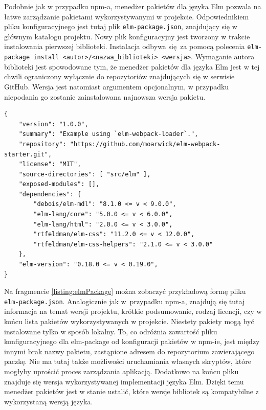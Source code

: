 Podobnie jak w przypadku npm-a, menedżer pakietów dla języka Elm pozwala na łatwe zarządzanie pakietami wykorzystywanymi w projekcie. Odpowiednikiem pliku konfiguracyjnego jest tutaj plik \lstinline{elm-package.json}, znajdujący się w głównym katalogu projektu. Nowy plik konfiguracyjny jest tworzony w trakcie instalowania pierwszej biblioteki. Instalacja odbywa się za pomocą polecenia \lstinline{elm-package install <autor>/<nazwa_biblioteki> <wersja>}. Wymaganie autora biblioteki jest spowodowane tym, że menedżer pakietów dla języka Elm jest w tej chwili ograniczony wyłącznie do repozytoriów znajdujących się w serwisie GitHub. Wersja jest natomiast argumentem opcjonalnym, w przypadku niepodania go zostanie zainstalowana najnowsza wersja pakietu.
\begin{minipage}{\linewidth}
\begin{lstlisting}[caption=Przykładowy plik elm-package.json, tabsize=2, label=listing:elmPackage]
{
	"version": "1.0.0",
	"summary": "Example using `elm-webpack-loader`.",
	"repository": "https://github.com/moarwick/elm-webpack-starter.git",
	"license": "MIT",
	"source-directories": [ "src/elm" ],
	"exposed-modules": [],
	"dependencies": {
		"debois/elm-mdl": "8.1.0 <= v < 9.0.0",
		"elm-lang/core": "5.0.0 <= v < 6.0.0",
		"elm-lang/html": "2.0.0 <= v < 3.0.0",
		"rtfeldman/elm-css": "11.2.0 <= v < 12.0.0",
		"rtfeldman/elm-css-helpers": "2.1.0 <= v < 3.0.0"
	},
	"elm-version": "0.18.0 <= v < 0.19.0",
}
\end{lstlisting}
\end{minipage}
Na fragmencie \ref{listing:elmPackage} można zobaczyć przykładową formę pliku \lstinline{elm-package.json}. Analogicznie jak w~przypadku npm-a, znajdują się tutaj informacja na temat wersji projektu, krótkie podsumowanie, rodzaj licencji, czy w końcu lista pakietów wykorzystywanych w projekcie. Niestety pakiety mogą być instalowane tylko w sposób lokalny. To, co odróżnia zawartość pliku konfiguracyjnego dla elm-package od konfiguracji pakietów w npm-ie, jest między innymi brak nazwy pakietu, zastąpione adresem do repozytorium zawierającego paczkę. Nie ma tutaj także możliwości uruchamiania własnych skryptów, które mogłyby uprościć proces zarządzania aplikacją. Dodatkowo na końcu pliku znajduje się wersja wykorzystywanej implementacji języka Elm. Dzięki temu menedżer pakietów jest w stanie ustalić, które wersje bibliotek są kompatybilne z wykorzystaną wersją języka.

